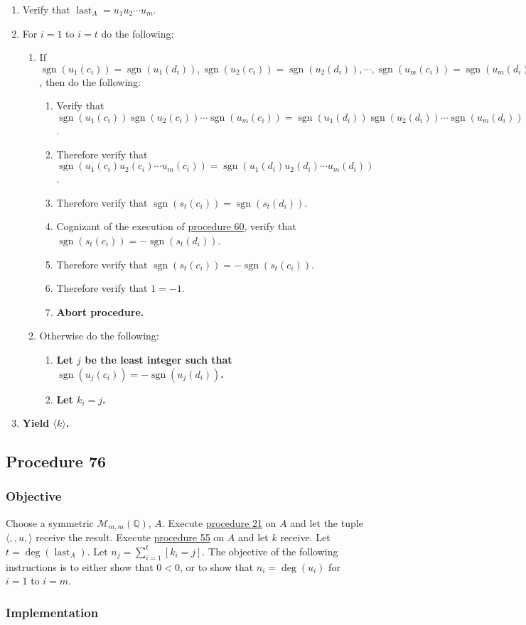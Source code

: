 \documentclass[twocolumn]{article}
\DeclareMathOperator{\sgn}{sgn}
\DeclareMathOperator{\last}{last}
\newcommand{\procedure}[2][]{\subsection*{Procedure #2 \ifthenelse{\equal{#1}{}}{}{(#1)}}\label{sec:procedure #2}}
\newcommand{\objective}{\subsubsection*{Objective}}
\newcommand{\implementation}{\subsubsection*{Implementation}}
\begin{document}
				\begin{enumerate}
					\item Verify that $\last_A=u_1u_2\cdots u_m$.
					\item For $i=1$ to $i=t$ do the following:
					\begin{enumerate}
						\item If $\sgn(u_1(c_i))=\sgn(u_1(d_i)), \sgn(u_2(c_i))=\sgn(u_2(d_i)), \cdots, \sgn(u_m(c_i))=\sgn(u_m(d_i))$, then do the following:
						\begin{enumerate}
							\item Verify that $\sgn(u_1(c_i))\sgn(u_2(c_i))\cdots\sgn(u_m(c_i))=\sgn(u_1(d_i))\sgn(u_2(d_i))\cdots\sgn(u_m(d_i))$.
							\item Therefore verify that $\sgn(u_1(c_i)u_2(c_i)\cdots u_m(c_i))=\sgn(u_1(d_i)u_2(d_i)\cdots u_m(d_i))$.
							\item Therefore verify that $\sgn(s_t(c_i))=\sgn(s_t(d_i))$.
							\item Cognizant of the execution of \hyperref[sec:procedure 60]{procedure 60}, verify that $\sgn(s_t(c_i))=-\sgn(s_t(d_i))$.
							\item Therefore verify that $\sgn(s_t(c_i))=-\sgn(s_t(c_i))$.
							\item Therefore verify that $1=-1$.
							\item \textbf{Abort procedure.}
						\end{enumerate}
						\item Otherwise do the following:
						\begin{enumerate}
							\item \textbf{Let $j$ be the least integer such that $\sgn(u_j(c_i))=-\sgn(u_j(d_i))$.}
							\item \textbf{Let $k_i=j$.}
						\end{enumerate}
					\end{enumerate}
					\item \textbf{Yield $\langle k\rangle$.}
				\end{enumerate}
		\procedure{76}
			\objective
				Choose a symmetric $\mathcal{M}_{m,m}(\mathbb{Q})$, $A$. Execute \hyperref[sec:procedure 21]{procedure 21} on $A$ and let the tuple $\langle,,u,\rangle$ receive the result. Execute \hyperref[sec:procedure 55]{procedure 55} on $A$ and let $k$ receive. Let $t=\deg(\last_A)$. Let $n_j=\sum_{i=1}^t [k_i=j]$. The objective of the following instructions is to either show that $0<0$, or to show that $n_i=\deg(u_i)$ for $i=1$ to $i=m$.
			\implementation
\end{document}
